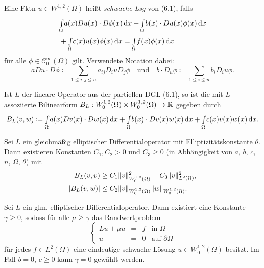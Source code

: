 \documentclass{cheat-sheet}
\begin{document}
\begin{defn}
  Eine Fktn $u \in W^{1,2}(\Omega)$ heißt \emph{schwache Lsg} von (6.1), falls
  \begin{align*}
    & {\textstyle \int\limits_{\Omega}^{}} a(x) Du(x) \cdot D \phi(x) \,\mathrm{d} x + {\textstyle \int\limits_{\Omega}^{}} b(x) \cdot Du(x) \phi(x) \,\mathrm{d} x \\
    & + {\textstyle \int\limits_{\Omega}^{}} c(x) u(x) \phi(x) \,\mathrm{d} x = {\textstyle \int\limits_{\Omega}^{}} f(x) \phi(x) \,\mathrm{d} x
  \end{align*}
  für alle $\phi \in \mathcal{C}_0^\infty(\Omega)$ gilt. Verwendete Notation dabei:
  \[
    a Du \cdot D \phi \coloneqq \sum_{1 \leq i, j \leq n} a_{ij} D_i u D_j \phi
    \quad \text{und} \quad
    b \cdot D_u \phi \coloneqq \sum_{1 \leq i \leq n} b_i D_i u \phi.
  \]
\end{defn}


\begin{defn}
  Ist $L$ der lineare Operator aus der partiellen DGL (6.1), so ist die mit $L$ assoziierte Bilinearform $B_L : W_0^{1,2}(\Omega) \times W_0^{1,2}(\Omega) \to \mathbb{R}$ gegeben durch
  \[
    B_L(v, w) \coloneqq {\textstyle \int\limits_{\Omega}^{}} a(x) Dv(x) \cdot Dw(x) \,\mathrm{d} x + {\textstyle \int\limits_{\Omega}^{}} b(x) \cdot Dv(x) w(x) \,\mathrm{d} x + {\textstyle \int\limits_{\Omega}^{}} c(x) v(x) w(x) \,\mathrm{d} x.
  \]
\end{defn}

\begin{lem}
  Sei $L$ ein gleichmäßig elliptischer Differentialoperator mit Elliptizitätskonstante $\theta$. Dann existieren Konstanten $C_1, C_2 > 0$ und $C_3 \geq 0$ (in Abhängigkeit von $a$, $b$, $c$, $n$, $\Omega$, $\theta$) mit
  \begin{align*}
    B_L(v,v) & \geq C_1 \lVert v\rVert^2_{W_0^{1,2}(\Omega)} - C_3 \lVert v\rVert^2_{L^2(\Omega)}, \\
    \lvert B_L(v,w)\rvert & \leq C_2 \lVert v\rVert_{W_0^{1,2}(\Omega)} \lVert w\rVert_{W_0^{1,2}(\Omega)}.
  \end{align*}
\end{lem}

\begin{satz}
  Sei $L$ ein glm. elliptischer Differentialoperator. Dann existiert eine Konstante $\gamma \geq 0$, sodass für alle $\mu \geq \gamma$ das Randwertproblem
  \[
    \left\{ \begin{array}{rlll}
      Lu + \mu u & = & f & \text{in } \Omega \\
      u & = & 0 & \text{auf } \partial \Omega
    \end{array} \right.
  \]
  für jedes $f \in L^2(\Omega)$ eine eindeutige schwache Lösung $u \in W_0^{1,2}(\Omega)$ besitzt. Im Fall $b = 0$, $c \geq 0$ kann $\gamma = 0$ gewählt werden.
\end{satz}

\end{document}
